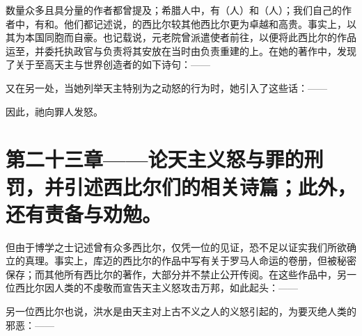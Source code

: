 数量众多且具分量的作者都曾提及；希腊人中，有（人）和（人）；我们自己的作者中，有和。他们都记述说，的西比尔较其他西比尔更为卓越和高贵。事实上，以其为本国同胞而自豪。也记载说，元老院曾派遣使者前往，以便将此西比尔的作品运至，并委托执政官与负责将其安放在当时由负责重建的上。在她的著作中，发现了关于至高天主与世界创造者的如下诗句：——\par

\par

又在另一处，当她列举天主特别为之动怒的行为时，她引入了这些话：——\par

\par

因此，祂向罪人发怒。\par


\section{第二十三章——论天主义怒与罪的刑罚，并引述西比尔们的相关诗篇；此外，还有责备与劝勉。}

但由于博学之士记述曾有众多西比尔，仅凭一位的见证，恐不足以证实我们所欲确立的真理。事实上，库迈的西比尔的作品中写有关于罗马人命运的卷册，但被秘密保存；而其他所有西比尔的著作，大部分并不禁止公开传阅。在这些作品中，另一位西比尔因人类的不虔敬而宣告天主义怒攻击万邦，如此起头：——\par

\par

另一位西比尔也说，洪水是由天主对上古不义之人的义怒引起的，为要灭绝人类的邪恶：——\par

\par

